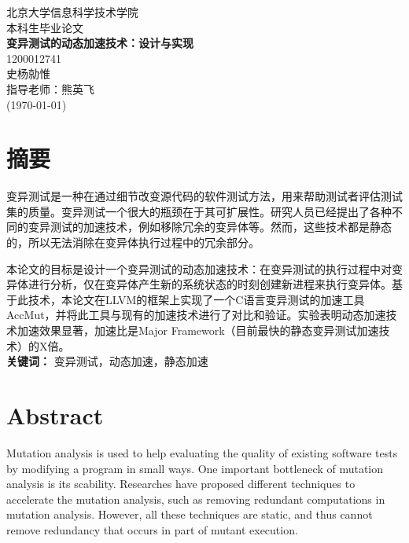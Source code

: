 \documentclass[nofonts]{ctexrep}
\begin{document}
%
\begin{titlepage}
\begin{center}
\LARGE

\vspace{20mm}
北京大学信息科学技术学院\\
\vspace{5mm}
本科生毕业论文\\
\vspace{70mm}
\textbf{\huge 变异测试的动态加速技术：设计与实现}\\
\vspace{20mm}
1200012741\\
史杨勍惟\\
\vspace{20mm}
指导老师：熊英飞\\
\vspace{10mm}
(\today)
\end{center}
\end{titlepage}

\renewcommand{\baselinestretch}{1.5}

\large
\chapter*{摘要}
变异测试是一种在通过细节改变源代码的软件测试方法，用来帮助测试者评估测试集的质量。变异测试一个很大的瓶颈在于其可扩展性。研究人员已经提出了各种不同的变异测试的加速技术，例如移除冗余的变异体等。然而，这些技术都是静态的，所以无法消除在变异体执行过程中的冗余部分。

本论文的目标是设计一个变异测试的动态加速技术：在变异测试的执行过程中对变异体进行分析，仅在变异体产生新的系统状态的时刻创建新进程来执行变异体。基于此技术，本论文在LLVM的框架上实现了一个C语言变异测试的加速工具AccMut，并将此工具与现有的加速技术进行了对比和验证。实验表明动态加速技术加速效果显著，加速比是Major Framework（目前最快的静态变异测试加速技术）的X倍。\\

\textbf{关键词：} 变异测试，动态加速，静态加速
\chapter*{Abstract}
Mutation analysis is used to help evaluating the quality of existing software tests by modifying a program in small ways. One important bottleneck of mutation analysis is its scability. Researches have proposed different techniques to accelerate the mutation analysis, such as removing redundant computations in mutation analysis. However, all these techniques are static, and thus cannot remove redundancy that occurs in part of mutant execution. 
\end{document}
